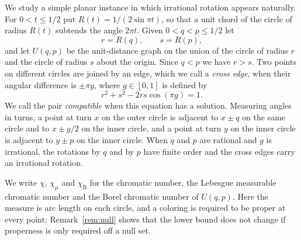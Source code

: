 \documentclass[11pt]{amsart}
\theoremstyle{remark}
\numberwithin{equation}{section}
\newcommand{\chiB}{\chi_{\mathrm B}}
\newcommand{\chiM}{\chi_{\mu}}
\begin{document}
We study a simple planar instance in which irrational rotation
appears naturally. For $0<t\le 1/2$ put $R(t)=1/(2\sin\pi t)$, so that a
unit chord of the circle of radius $R(t)$ subtends the angle $2\pi t$.
Given $0<q<p\le1/2$ let
\[
r=R(q),\qquad s=R(p),
\]
and let $U(q,p)$ be the unit-distance graph on the union of the circle
of radius $r$ and the circle of radius $s$ about the origin. Since
$q<p$ we have $r>s$. Two points on different circles are joined by an
edge, which we call a \emph{cross edge}, when their angular difference
is $\pm\pi g$, where $g\in[0,1]$ is defined by
\begin{equation}\label{eq:cross}
r^2+s^2-2rs\cos(\pi g)=1.
\end{equation}
We call the pair \emph{compatible} when this equation has a solution.
Measuring angles in turns, a point at turn $x$ on the outer circle is
adjacent to $x\pm q$ on the same circle and to $x\pm g/2$ on the inner
circle, and a point at turn $y$ on the inner circle is adjacent to
$y\pm p$ on the inner circle. When $q$ and $p$ are rational and $g$ is
irrational, the rotations by $q$ and by $p$ have finite order and the
cross edges carry an irrational rotation.

We write $\chi$, $\chiM$ and $\chiB$ for the chromatic number, the
Lebesgue measurable chromatic number and the Borel chromatic number of
$U(q,p)$. Here the measure is arc length on each circle, and a
coloring is required to be proper at every point; Remark~\ref{rem:null}
shows that the lower bound does not change if properness is only
required off a null set.
\end{document}
